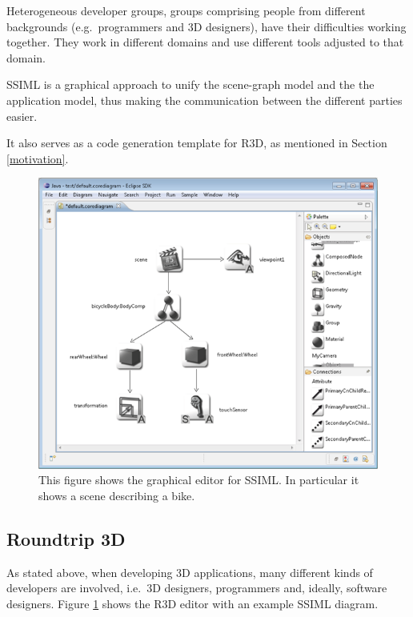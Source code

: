 Heterogeneous developer groups, groups comprising people from
different backgrounds (e.g.~programmers and \gls{3D} designers), have their difficulties
working together. They work in different domains and use different tools
adjusted to that domain. \cite{Glinz:2015:SUS:2802768.2802838}

SSIML is a graphical approach to unify the scene-graph model and the the
application model, thus making the communication between the different
parties easier.

It also serves as a code generation template for \gls{R3D}, as mentioned in Section \ref{motivation}.

\begin{figure}
  \centering
  \includegraphics[width=12cm]{../assets/SSIML.png}
	\caption{This figure shows the graphical editor for SSIML. In particular it shows a scene describing a bike. \cite{roundtrip3dwebsite}}
	\label{fig:ssimldiagram}
\end{figure}

\subsection{Roundtrip 3D}\label{roundtrip-3d}

As stated above, when developing \gls{3D} applications, many different kinds of
developers are involved, i.e.~\gls{3D} designers, programmers and, ideally, 
software designers. Figure \ref{fig:ssimldiagram} shows the \gls{R3D} editor with an example \gls{SSIML} diagram.


